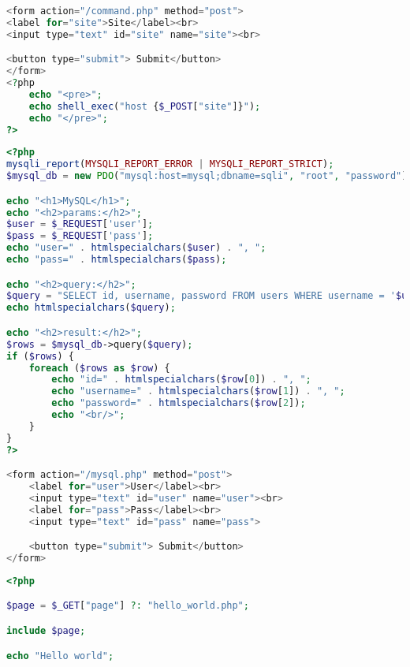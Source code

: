 \documentclass[./../main.tex]{subfiles}
\begin{document}
\begin{lstlisting}[language=php, caption=Lỗ hổng Command Injection, label={src:cmdi}]
<form action="/command.php" method="post">
<label for="site">Site</label><br>
<input type="text" id="site" name="site"><br>

<button type="submit"> Submit</button>
</form>
<?php
    echo "<pre>";
    echo shell_exec("host {$_POST["site"]}");
    echo "</pre>";
?>
\end{lstlisting}


\begin{lstlisting}[language=php, caption=Lỗ hổng SQL Injection, label={src:sqli}]
<?php
mysqli_report(MYSQLI_REPORT_ERROR | MYSQLI_REPORT_STRICT);
$mysql_db = new PDO("mysql:host=mysql;dbname=sqli", "root", "password");

echo "<h1>MySQL</h1>";
echo "<h2>params:</h2>";
$user = $_REQUEST['user'];
$pass = $_REQUEST['pass'];
echo "user=" . htmlspecialchars($user) . ", ";
echo "pass=" . htmlspecialchars($pass);

echo "<h2>query:</h2>";
$query = "SELECT id, username, password FROM users WHERE username = '$user' and password = '$pass'";
echo htmlspecialchars($query);

echo "<h2>result:</h2>";
$rows = $mysql_db->query($query);
if ($rows) {
    foreach ($rows as $row) {
        echo "id=" . htmlspecialchars($row[0]) . ", ";
        echo "username=" . htmlspecialchars($row[1]) . ", ";
        echo "password=" . htmlspecialchars($row[2]);
        echo "<br/>";
    }
}
?>

<form action="/mysql.php" method="post">
    <label for="user">User</label><br>
    <input type="text" id="user" name="user"><br>
    <label for="pass">Pass</label><br>
    <input type="text" id="pass" name="pass">

    <button type="submit"> Submit</button>
</form>
\end{lstlisting}

\begin{lstlisting}[language=php, caption=Lỗ hổng Local File Inclusion và Remote File Inclusion, label={src:rfi}]
<?php

$page = $_GET["page"] ?: "hello_world.php";

include $page;

echo "Hello world";

\end{lstlisting}
\end{document}
